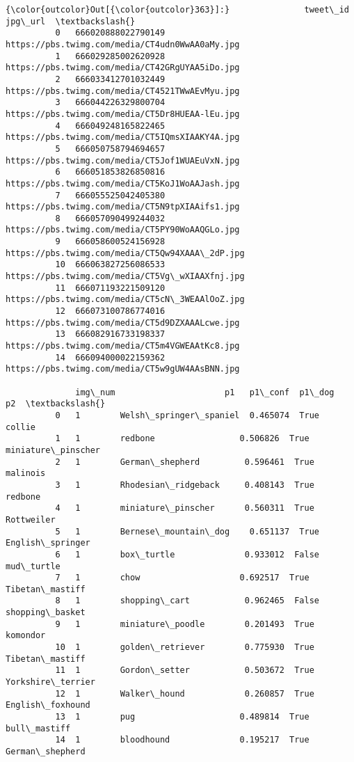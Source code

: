 \documentclass[11pt]{article}
\begin{document}
\begin{Verbatim}[commandchars=\\\{\}]
{\color{outcolor}Out[{\color{outcolor}363}]:}               tweet\_id                                          jpg\_url  \textbackslash{}
          0   666020888022790149  https://pbs.twimg.com/media/CT4udn0WwAA0aMy.jpg   
          1   666029285002620928  https://pbs.twimg.com/media/CT42GRgUYAA5iDo.jpg   
          2   666033412701032449  https://pbs.twimg.com/media/CT4521TWwAEvMyu.jpg   
          3   666044226329800704  https://pbs.twimg.com/media/CT5Dr8HUEAA-lEu.jpg   
          4   666049248165822465  https://pbs.twimg.com/media/CT5IQmsXIAAKY4A.jpg   
          5   666050758794694657  https://pbs.twimg.com/media/CT5Jof1WUAEuVxN.jpg   
          6   666051853826850816  https://pbs.twimg.com/media/CT5KoJ1WoAAJash.jpg   
          7   666055525042405380  https://pbs.twimg.com/media/CT5N9tpXIAAifs1.jpg   
          8   666057090499244032  https://pbs.twimg.com/media/CT5PY90WoAAQGLo.jpg   
          9   666058600524156928  https://pbs.twimg.com/media/CT5Qw94XAAA\_2dP.jpg   
          10  666063827256086533  https://pbs.twimg.com/media/CT5Vg\_wXIAAXfnj.jpg   
          11  666071193221509120  https://pbs.twimg.com/media/CT5cN\_3WEAAlOoZ.jpg   
          12  666073100786774016  https://pbs.twimg.com/media/CT5d9DZXAAALcwe.jpg   
          13  666082916733198337  https://pbs.twimg.com/media/CT5m4VGWEAAtKc8.jpg   
          14  666094000022159362  https://pbs.twimg.com/media/CT5w9gUW4AAsBNN.jpg   
          
              img\_num                      p1   p1\_conf  p1\_dog                  p2  \textbackslash{}
          0   1        Welsh\_springer\_spaniel  0.465074  True    collie               
          1   1        redbone                 0.506826  True    miniature\_pinscher   
          2   1        German\_shepherd         0.596461  True    malinois             
          3   1        Rhodesian\_ridgeback     0.408143  True    redbone              
          4   1        miniature\_pinscher      0.560311  True    Rottweiler           
          5   1        Bernese\_mountain\_dog    0.651137  True    English\_springer     
          6   1        box\_turtle              0.933012  False   mud\_turtle           
          7   1        chow                    0.692517  True    Tibetan\_mastiff      
          8   1        shopping\_cart           0.962465  False   shopping\_basket      
          9   1        miniature\_poodle        0.201493  True    komondor             
          10  1        golden\_retriever        0.775930  True    Tibetan\_mastiff      
          11  1        Gordon\_setter           0.503672  True    Yorkshire\_terrier    
          12  1        Walker\_hound            0.260857  True    English\_foxhound     
          13  1        pug                     0.489814  True    bull\_mastiff         
          14  1        bloodhound              0.195217  True    German\_shepherd      
          

\end{Verbatim}
\end{document}
